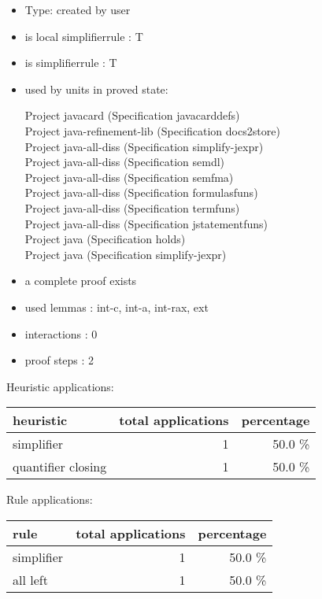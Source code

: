\documentclass[a4paper]{article}
\begin{document}
\begin{itemize}

\item Type: created by user

\item is local simplifierrule : T
\item is simplifierrule : T
\item used by units in proved state:

Project javacard (Specification javacarddefs) \\
Project java-refinement-lib (Specification docs2store) \\
Project java-all-diss (Specification simplify-jexpr) \\
Project java-all-diss (Specification semdl) \\
Project java-all-diss (Specification semfma) \\
Project java-all-diss (Specification formulasfuns) \\
Project java-all-diss (Specification termfuns) \\
Project java-all-diss (Specification jstatementfuns) \\
Project java (Specification holds) \\
Project java (Specification simplify-jexpr)
\item       a complete proof exists
\item       used lemmas  : int-c, int-a, int-rax, ext
\item       interactions : 0
\item       proof steps  : 2
\end{itemize}

\medskip


Heuristic applications:

\begin{supertabular}{l|r|r}
heuristic	& total applications & percentage \\ \hline
simplifier & 1 & 50.0 \% \\
quantifier closing & 1 & 50.0 \% \\

\end{supertabular}

Rule applications:

\begin{supertabular}{l|r|r}
rule	        & total applications & percentage \\ \hline
simplifier & 1 & 50.0 \% \\
all left & 1 & 50.0 \% \\

\end{supertabular}
\end{document}
